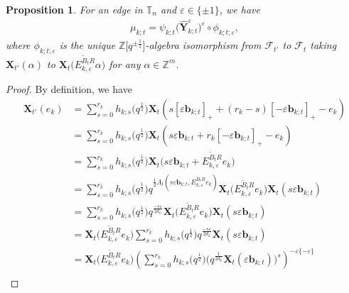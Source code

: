 \documentclass[pdftex]{sigma}
\newcommand{\Z}{\mathbb{Z}}
\numberwithin{equation}{section}
\newtheorem{Proposition}[Theorem]{Proposition}
 { \theoremstyle{definition}
\newtheorem{Definition}[Theorem]{Definition}
\newtheorem{Note}[Theorem]{Note}
\newtheorem{Example}[Theorem]{Example}
\newtheorem{Remark}[Theorem]{Remark} }
\begin{document}
\begin{Proposition}\label{quantum-decomposition}
 For an edge  in $\mathbb{T}_n$ and $\varepsilon\in \{\pm 1\}$, we have
 \begin{align}\label{eq:FG-dec-gqca}
 \mu_{k;t}=\psi_{k;t}\bigl(\mathbf{\hat{Y}}_{k;t}^{\varepsilon}\bigr)^{\varepsilon}\circ\phi_{k;t;\varepsilon},
 \end{align}
 where $\phi_{k;t;\varepsilon}$ is the unique $\Z\big[q^{\pm\!\frac{1}{2}}\big]$-algebra isomorphism from $\mathcal{F}_{t'}$ to $\mathcal{F}_{\!t}$ taking $\mathbf{X}_{\!t'}(\alpha)$ to $\mathbf{X}_{t}\bigl(E_{\!k,\varepsilon}^{\tilde{B}_{t}R}\alpha\bigr)$ for any $\alpha\in\mathbb{Z}^{m}$.
\end{Proposition}
\begin{proof}
 By definition, we have
 \begin{align*}
 \mathbf{X}_{t'}(e_{k})
 &=\sum\limits^{r_{k}}_{s=0}h_{k;s}\bigl(q^{\frac{1}{2}}\bigr)\mathbf{X}_{t}(s[\varepsilon\mathbf{b}_{k;t}]_{+}+(r_{k}-s)[-\varepsilon\mathbf{b}_{k;t}]_{+}-e_{k})\\
 & =\sum\limits^{r_{k}}_{s=0}h_{k;s}\bigl(q^{\frac{1}{2}}\bigr)\mathbf{X}_{t}(s\varepsilon\mathbf{b}_{k;t}+r_{k}[-\varepsilon\mathbf{b}_{k;t}]_{+}-e_{k})\\
 &=\sum\limits^{r_{k}}_{s=0}h_{k;s}\bigl(q^{\frac{1}{2}}\bigr)\mathbf{X}_{t}\bigl(s\varepsilon\mathbf{b}_{k;t}+E_{k,\varepsilon}^{\tilde{B}_{t}R}e_{k}\bigr)\\
 &=\sum\limits^{r_{k}}_{s=0}h_{k;s}\bigl(q^{\frac{1}{2}}\bigr)q^{\frac{1}{2}\Lambda_{t}(s\varepsilon\mathbf{b}_{k;t},E_{k,\varepsilon}^{\tilde{B}_{t}R}e_{k})}\mathbf{X}_{t}\bigl(E^{\tilde{B}_{t}R}_{k,\varepsilon}e_{k}\bigr)\mathbf{X}_{t}(s\varepsilon\mathbf{b}_{k;t})\\
 &=\sum\limits^{r_{k}}_{s=0}h_{k;s}\bigl(q^{\frac{1}{2}}\bigr)q^{\frac{-s\varepsilon}{2d_{k}}}\mathbf{X}_{t}\bigl(E^{\tilde{B}_{t}R}_{k,\varepsilon}e_{k}\bigr)\mathbf{X}_{t}(s\varepsilon\mathbf{b}_{k;t})\\
 &=\mathbf{X}_{t}\bigl(E^{\tilde{B}_{t}R}_{k,\varepsilon}e_{k}\bigr)\sum\limits^{r_{k}}_{s=0}h_{k;s}\bigl(q^{\frac{1}{2}}\bigr)q^{\frac{-s\varepsilon}{2d_{k}}}\mathbf{X}_{t}(s\varepsilon\mathbf{b}_{k;t})\\
 &=\mathbf{X}_{t}\bigl(E^{\tilde{B}_{t}R}_{k,\varepsilon}e_{k}\bigr)\left(\sum\limits^{r_{k}}_{s=0}h_{k;s}\bigl(q^{\frac{1}{2}}\bigr)\bigl(q^{\frac{1}{2d_{k}}}\mathbf{X}_{t}(\varepsilon\mathbf{b}_{k;t})\bigr)^{s}\right)^{-\varepsilon\{-\varepsilon\}}\\

\end{align*}
\end{proof}
\end{document}
